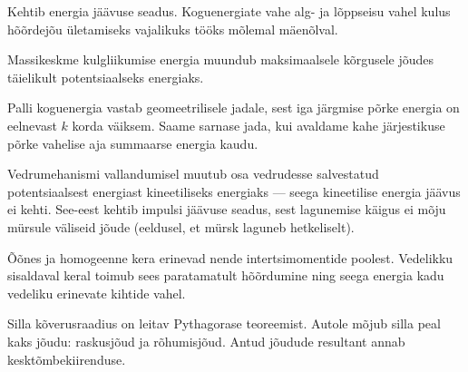 \documentclass[10pt]{article}
\begin{document}
{%

\hint
Kehtib energia jäävuse seadus. Koguenergiate vahe alg- ja lõppseisu vahel kulus hõõrdejõu ületamiseks vajalikuks tööks mõlemal mäenõlval.
\probend
\bigskip


\hint
Massikeskme kulgliikumise energia muundub maksimaalsele kõrgusele jõudes täielikult potentsiaalseks energiaks.
\probend
\bigskip


\hint
Palli koguenergia vastab geomeetrilisele jadale, sest iga järgmise põrke energia on eelnevast $k$ korda väiksem. Saame sarnase jada, kui avaldame kahe järjestikuse põrke vahelise aja summaarse energia kaudu.
\probend
\bigskip


\hint
Vedrumehanismi vallandumisel muutub osa vedrudesse salvestatud potentsiaalsest energiast kineetiliseks energiaks --- seega kineetilise energia jäävus ei kehti. See-eest kehtib impulsi jäävuse seadus, sest lagunemise käigus ei mõju mürsule väliseid jõude (eeldusel, et mürsk laguneb hetkeliselt).
\probend
\bigskip


\hint
Õõnes ja homogeenne kera erinevad nende intertsimomentide poolest. Vedelikku sisaldaval keral toimub sees paratamatult hõõrdumine ning seega energia kadu vedeliku erinevate kihtide vahel.
\probend
\bigskip


\hint
Silla kõverusraadius on leitav Pythagorase teoreemist. Autole mõjub silla peal kaks jõudu: raskusjõud ja rõhumisjõud. Antud jõudude resultant annab kesktõmbekiirenduse.
\probend
\bigskip


}
\end{document}
